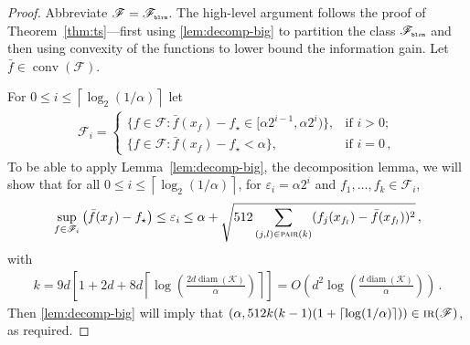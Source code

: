 \documentclass[letter, 12pt]{report}
\newcommand{\pr}{\text{\tiny\texttt{r}}}
\newcommand{\pb}{\text{\tiny\texttt{b}}}
\newcommand{\pl}{\text{\tiny\texttt{l}}}
\renewcommand{\pm}{\text{\tiny\texttt{m}}}
\newcommand{\ceil}[1]{\left\lceil #1 \right\rceil}
\newcommand{\pair}{\operatorname{\textsc{pair}}}
\newcommand{\cK}{\mathcal K}
\newcommand{\sF}{\mathscr F}
\newcommand{\conv}{\operatorname{conv}}
\newcommand{\diam}{\operatorname{diam}}
\newcommand{\1}{\mathbf{1}}
\newcommand{\IR}{\operatorname{\textsc{ir}}}
\renewcommand{\epsilon}{\varepsilon}
\theoremstyle{plain}
\theoremstyle{definition}
\theoremstyle{remark}
\begin{document}
\begin{proof}
    Abbreviate $\sF = \sF_{\pb\pl\pr\pm}$.
    The high-level argument follows the proof of Theorem~\ref{thm:ts}---first using \cref{lem:decomp-big} to partition the class $\sF_{\pb\pl\pr\pm}$ and then using convexity of the functions to lower bound the information gain.
    Let $\bar{f} \in \conv(\sF)$.

    For $0 \leq i \leq \ceil{\log_2(1/\alpha)}$ let
    \begin{align*}
        \sF_i = \begin{cases}
                    \{f \in \sF : \bar f(x_f) - f_\star \in [\alpha 2^{i-1}, \alpha 2^{i})\}, & \text{if } i > 0;    \\
                    \{f \in \sF : \bar f(x_f) - f_\star < \alpha\},                           & \text{if } i = 0 \,,
                \end{cases}
    \end{align*}
    To be able to apply Lemma~\ref{lem:decomp-big}, the decomposition lemma, we will show that for all $0 \leq i \leq \ceil{\log_2(1/\alpha)}$,
    for $\epsilon_i = \alpha 2^i$ and $f_1,\ldots,f_k \in \sF_i$,
    \begin{align}
        \sup_{f \in \sF_i} \left(\bar f(x_f) - f_\star\right) \leq \epsilon_i \leq \alpha + \sqrt{512 \sum_{(j, l) \in \pair(k)} (f_j(x_{f_l}) - \bar f(x_{f_l}))^2}\,,
        \label{eq:ridge:condition}
    \end{align}
    with
    \begin{align*}
        k = 9d\left[1 + 2d + 8d\ceil{\log\left(\frac{2d \diam(\cK)}{\alpha}\right)}\right] = O\left(d^2 \log\left(\frac{d \diam(\cK)}{\alpha}\right)\right) \,.
    \end{align*}
    Then \cref{lem:decomp-big} will imply that $(\alpha, 512k(k-1) (1 + \ceil{\log(1/\alpha)})) \in \IR(\sF)$, as required.


\end{proof}
\end{document}
